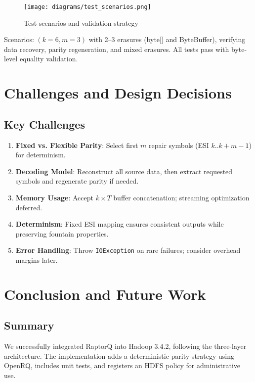 \documentclass{article}
\begin{document}
\begin{figure}[h]
\centering
\texttt{[image: diagrams/test\_scenarios.png]}
\caption{\label{fig:testing}Test scenarios and validation strategy}
\end{figure}

Scenarios: $(k=6, m=3)$ with 2–3 erasures (byte[] and ByteBuffer), verifying data recovery, parity regeneration, and mixed erasures. All tests pass with byte-level equality validation.

\section{Challenges and Design Decisions}

\subsection{Key Challenges}

\begin{enumerate}
\item \textbf{Fixed vs. Flexible Parity}: Select first $m$ repair symbols (ESI $k..k+m-1$) for determinism.
\item \textbf{Decoding Model}: Reconstruct all source data, then extract requested symbols and regenerate parity if needed.
\item \textbf{Memory Usage}: Accept $k \times T$ buffer concatenation; streaming optimization deferred.
\item \textbf{Determinism}: Fixed ESI mapping ensures consistent outputs while preserving fountain properties.
\item \textbf{Error Handling}: Throw \texttt{IOException} on rare failures; consider overhead margins later.
\end{enumerate}

\section{Conclusion and Future Work}

\subsection{Summary}

We successfully integrated RaptorQ into Hadoop 3.4.2, following the three-layer architecture. The implementation adds a deterministic parity strategy using OpenRQ, includes unit tests, and registers an HDFS policy for administrative use.
\end{document}
